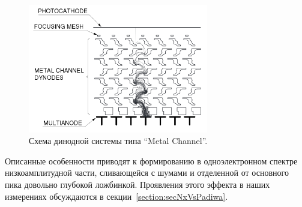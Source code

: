 \begin{figure}[H]
\centering
\includegraphics[width=0.7\textwidth]{pictures/2_Metal_channel.png}
\caption{Схема динодной системы типа ``Metal Channel''.}
\label{fig:MetalChannel}
\end{figure}

Описанные особенности приводят к формированию в одноэлектронном спектре низкоамплитудной части, сливающейся с шумами и отделенной от основного пика довольно глубокой ложбинкой. Проявления этого эффекта в наших измерениях обсуждаются в секции~\ref{section:secNxVsPadiwa}.
